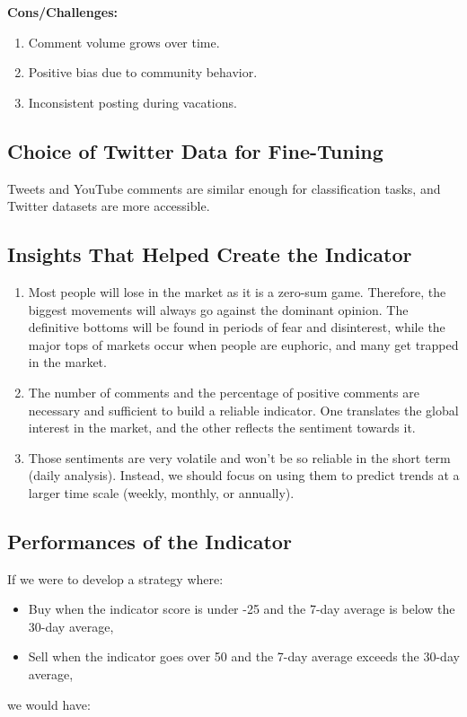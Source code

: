 \documentclass[12pt,a4paper]{article}
\begin{document}
\textbf{Cons/Challenges:}
\begin{enumerate}
    \item Comment volume grows over time.
    \item Positive bias due to community behavior.
    \item Inconsistent posting during vacations.
\end{enumerate}

\subsection*{Choice of Twitter Data for Fine-Tuning}
Tweets and YouTube comments are similar enough for classification tasks, and Twitter datasets are more accessible.

\subsection*{Insights That Helped Create the Indicator}
\begin{enumerate}
    \item Most people will lose in the market as it is a zero-sum game. Therefore, the biggest movements will always go against the dominant opinion. The definitive bottoms will be found in periods of fear and disinterest, while the major tops of markets occur when people are euphoric, and many get trapped in the market.
    \item The number of comments and the percentage of positive comments are necessary and sufficient to build a reliable indicator. One translates the global interest in the market, and the other reflects the sentiment towards it.
    \item Those sentiments are very volatile and won't be so reliable in the short term (daily analysis). Instead, we should focus on using them to predict trends at a larger time scale (weekly, monthly, or annually).
\end{enumerate}

\subsection*{Performances of the Indicator}
If we were to develop a strategy where:
\begin{itemize}
    \item Buy when the indicator score is under -25 and the 7-day average is below the 30-day average,
    \item Sell when the indicator goes over 50 and the 7-day average exceeds the 30-day average,
\end{itemize}
we would have:
\end{document}
